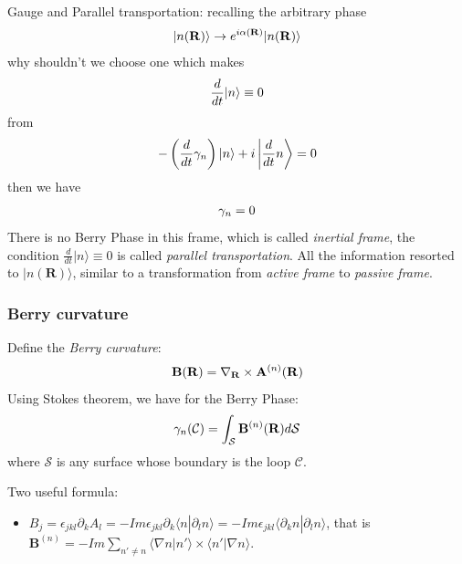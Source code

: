 \documentclass[letterpaper,10pt,english]{sphinxmanual}
\begin{document}
Gauge and Parallel transportation: recalling the arbitrary phase
\begin{gather}
\begin{split}|n(\mathbf{R})\rangle \to e^{i\alpha(\mathbf{R})}|n(\mathbf{R})\rangle\end{split}\notag
\end{gather}
why shouldn't we choose one which makes
\begin{gather}
\begin{split}\frac{d}{dt}|n\rangle\equiv 0\end{split}\notag
\end{gather}
from
\begin{gather}
\begin{split}-\left(\frac{d}{dt}\gamma_n\right)|n\rangle+i\left|\frac{d}{dt}n\right\rangle=0\end{split}\notag
\end{gather}
then we have
\begin{gather}
\begin{split}\gamma_n=0\end{split}\notag
\end{gather}
There is no Berry Phase in this frame, which is called \emph{inertial
frame}, the condition \(\frac{d}{dt}|n\rangle\equiv 0\) is called
\emph{parallel transportation}. All the information resorted to
\(|n(\mathbf{R})\rangle\), similar to a transformation from \emph{active
frame} to \emph{passive frame}.


\subsubsection{Berry curvature}
\label{TI/Lecture notes/2:berry-curvature}
Define the \emph{Berry curvature}:
\begin{gather}
\begin{split}\mathbf{B}(\mathbf{R})=\nabla_{\mathbf{R}}\times \mathbf{A}^{(n)}(\mathbf{R})\end{split}\notag
\end{gather}
Using Stokes theorem, we have for the Berry Phase:
\begin{gather}
\begin{split}\gamma_n(\mathcal{C})=\int_\mathcal{S}\mathbf{B}^{(n)}(\mathbf{R})d\mathcal{S}\end{split}\notag
\end{gather}
where \(\mathcal{S}\) is any surface whose boundary is the loop
\(\mathcal{C}\).

Two useful formula:
\begin{itemize}
\item {} 
\(B_j=\epsilon_{jkl}\partial_kA_l=-Im\epsilon_{jkl}\partial_k\langle n|\partial_ln\rangle=-Im\epsilon_{jkl}\langle\partial_kn|\partial_ln\rangle\),
that is
\(\mathbf{B}^{(n)}=-Im\sum\limits_{n'\neq n}\langle\nabla n|n'\rangle\times\langle n'|\nabla n\rangle\).

\end{itemize}
\end{document}
